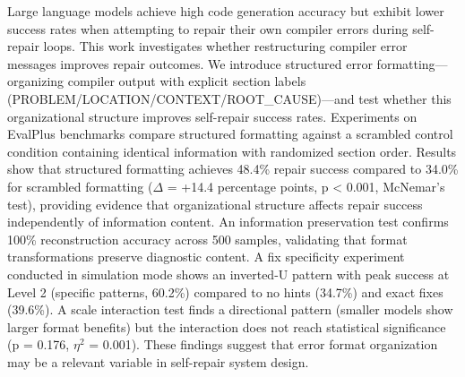 
Large language models achieve high code generation accuracy but exhibit lower success rates when attempting to repair their own compiler errors during self-repair loops. This work investigates whether restructuring compiler error messages improves repair outcomes. We introduce structured error formatting---organizing compiler output with explicit section labels (PROBLEM/LOCATION/CONTEXT/ROOT\_CAUSE)---and test whether this organizational structure improves self-repair success rates. Experiments on EvalPlus benchmarks compare structured formatting against a scrambled control condition containing identical information with randomized section order. Results show that structured formatting achieves 48.4\% repair success compared to 34.0\% for scrambled formatting ($\Delta$ = +14.4 percentage points, p < 0.001, McNemar's test), providing evidence that organizational structure affects repair success independently of information content. An information preservation test confirms 100\% reconstruction accuracy across 500 samples, validating that format transformations preserve diagnostic content. A fix specificity experiment conducted in simulation mode shows an inverted-U pattern with peak success at Level 2 (specific patterns, 60.2\%) compared to no hints (34.7\%) and exact fixes (39.6\%). A scale interaction test finds a directional pattern (smaller models show larger format benefits) but the interaction does not reach statistical significance (p = 0.176, $\eta^2$ = 0.001). These findings suggest that error format organization may be a relevant variable in self-repair system design.
